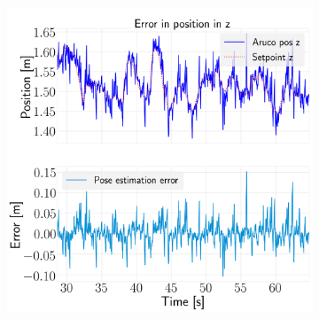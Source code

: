 \documentclass[../Head/report.tex]{subfiles}
\begin{document}
\begin{figure}[H]
\begin{subfigure}[t]{.30\textwidth}
        \caption{}
        \label{fig:vision_navigation_error_y}
    \end{subfigure}
     \hspace{0.2em}
    \begin{subfigure}[t]{.30\textwidth}
        \centering
        \includegraphics[width=\textwidth]{../Figures/vision_navigation/test1_full_pattern_board/error_z/pose_error_z_test1.png}
        \caption{}
        \label{fig:vision_navigation_error_z}
    \end{subfigure}
    \caption{}
    \label{fig:vision_navigation_error_pos}
\end{figure}
\end{document}
